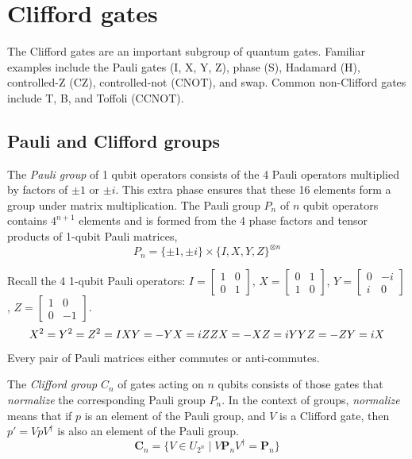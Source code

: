 

\clearpage


\section{Clifford gates}
\label{sec:Clifford}
The Clifford gates are an important subgroup of quantum gates. Familiar examples include the Pauli gates (I, X, Y, Z), phase (S), Hadamard (H), controlled-Z (CZ), controlled-not (CNOT), and swap.  Common non-Clifford gates include T, B, and Toffoli (CCNOT). 

\subsection{Pauli and Clifford groups}

The {\sl Pauli group} of 1 qubit operators  consists of the 4 Pauli operators  multiplied by factors of $\pm 1$ or $\pm i$. This extra phase ensures that these 16 elements form a group under matrix multiplication. The Pauli group $P_n$ of $n$ qubit operators contains $4^{n+1}$ elements and is formed from the 4 phase factors and tensor products of 1-qubit Pauli matrices, 
\[
P_n = \{\pm 1, \pm i\} \times \{I, X, Y, Z\}^{\otimes n}
\]

Recall the 4 1-qubit Pauli operators: $I=[\begin{smallmatrix} 1& 0 \\ 0 & 1 \end{smallmatrix}]$,
$X=[\begin{smallmatrix}0 & 1 \\ 1 & 0 \end{smallmatrix}]$, $Y=[\begin{smallmatrix}0 & -i \\ i & 0 \end{smallmatrix}]$, $Z=[\begin{smallmatrix}1 & 0 \\ 0 & -1 \end{smallmatrix}]$.
\[
X^2 = Y^2 = Z^2 = I  \\
XY = -YX = iZ \notag\\
ZX = -XZ = iY \notag\\
YZ = -ZY = iX \notag
\]
Every pair of Pauli matrices either commutes or anti-commutes. 



The {\sl Clifford group}  $C_n$ of gates acting on $n$ qubits consists of those gates that {\sl normalize} the corresponding Pauli group $P_n$. In the context of groups, {\sl normalize} means that if $p$ is an element of the Pauli group, and $V$ is a Clifford gate, then $p' = V p V^\dagger$ is also an element of the Pauli group.
\[
\mathbf{C}_n=\{V\in U_{2^n}\mid V\mathbf{P}_nV^\dagger = \mathbf{P}_n\}
\]


